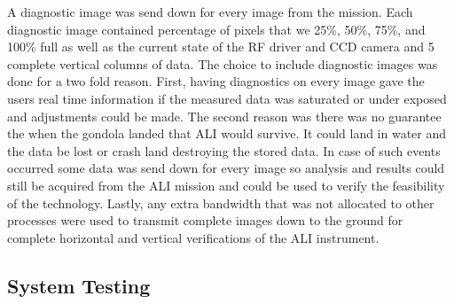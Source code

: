 A diagnostic image was send down for every image from the mission. Each diagnostic image contained percentage of pixels that we 25\%, 50\%, 75\%, and 100\% full as well as the current state of the RF driver and CCD camera and 5 complete vertical columns of data. The choice to include diagnostic images was done for a two fold reason. First, having diagnostics on every image gave the users real time information if the measured data was saturated or under exposed and adjustments could be made. The second reason was there was no guarantee the when the gondola landed that ALI would survive. It could land in water and the data be lost or crash land destroying the stored data. In case of such events occurred some data was send down for every image so analysis and results could still be acquired from the ALI mission and could be used to verify the feasibility of the technology. Lastly, any extra bandwidth that was not allocated to other processes were used to transmit complete images down to the ground for complete horizontal and vertical verifications of the ALI instrument.

\subsection{System Testing}



